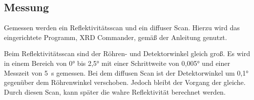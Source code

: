 \subsection{Messung}
Gemessen werden ein Reflektivitätsscan und ein diffuser Scan.
Hierzu wird das eingerichtete Programm, XRD Commander, gemäß der Anleitung\cite{sample} genutzt.

Beim Reflektivitätsscan sind der Röhren- und Detektorwinkel gleich groß. Es wird in
einem Bereich von 0° bis 2,5° mit einer Schrittweite von 0,005° und einer Messzeit von
\qty{5}{\second} gemessen.
Bei dem diffusen Scan ist der Detektorwinkel um 0,1° gegenüber dem Röhrenwinkel
verschoben. Jedoch bleibt der Vorgang der gleiche. Durch diesen Scan, kann später die wahre Reflektivität berechnet werden.
